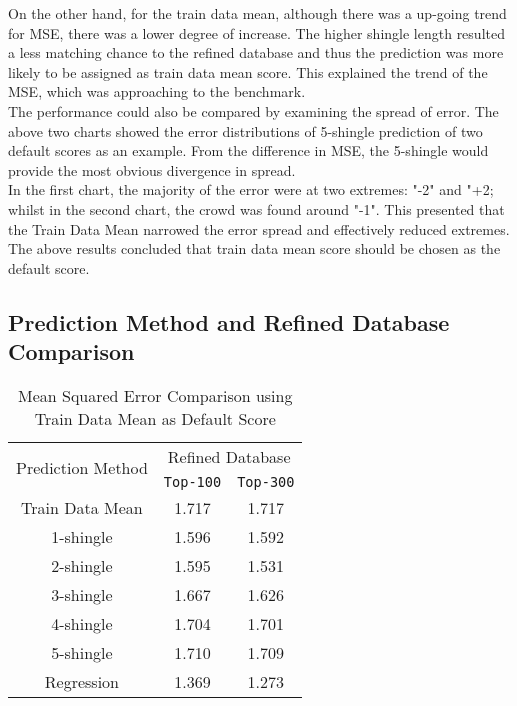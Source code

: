 On the other hand, for the train data mean, although there was a up-going trend for MSE, there was a lower degree of increase.
The higher shingle length resulted a less matching chance to the refined database and thus the prediction was more likely to be assigned as train data mean score. This explained the trend of the MSE, which was approaching to the benchmark.\\
The performance could also be compared by examining the spread of error. The above two charts showed the error distributions of 5-shingle prediction of two default scores as an example. From the difference in MSE, the 5-shingle would provide the most obvious divergence in spread.\\
In the first chart, the majority of the error were at two extremes: "-2" and "+2; whilst in the second chart, the crowd was found around "-1". This presented that the Train Data Mean narrowed the error spread and effectively reduced extremes.
The above results concluded that train data mean score should be chosen as the default score.




\subsection{Prediction Method and Refined Database Comparison}

\begin{table}[H]
\caption{Mean Squared Error Comparison using Train Data Mean as Default Score}
	\begin{tabular}{ccc}
			\toprule
				\multirow{2}{*}{Prediction Method} &
				\multicolumn{2}{c}{Refined Database}\\
				\cline{2-3}
				& \texttt{Top-100} &  \texttt{Top-300} \\
			\midrule
				Train Data Mean & 1.717 & 1.717 \\
				\hline
				1-shingle & 1.596 & 1.592\\
				2-shingle & 1.595 & 1.531\\
				3-shingle & 1.667 & 1.626\\
				4-shingle & 1.704 & 1.701\\
				5-shingle & 1.710 & 1.709\\
				\hline
				Regression & 1.369 & 1.273\\

			\bottomrule
		\end{tabular}

\end{table}

